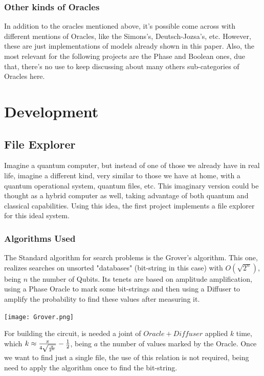 \documentclass{article}
\makeatletter
\renewcommand\subsubsubsection{\@startsection{paragraph}{4}{\z@}{-2.5ex\@plus -1ex \@minus -.25ex}{1.25ex \@plus .25ex}{\normalfont\normalsize\bfseries}}
\makeatother
\begin{document}
\subsubsection{Other kinds of Oracles}
In addition to the oracles mentioned above, it's possible come across with different mentions of Oracles, like the Simons's, Deutsch-Jozsa's, etc. However, these are just implementations of models already shown in this paper. Also, the most relevant for the following projects are the Phase and Boolean ones, due that, there's no use to keep discussing about many others sub-categories of Oracles here.

\newpage

\section{Development}


\subsection{File Explorer} \label{file-explorer}
Imagine a quantum computer, but instead of one of those we already have in real life, imagine a different kind, very similar to those we have at home, with a quantum operational system, quantum files, etc. This imaginary version could be thought as a hybrid computer as well, taking advantage of both quantum and classical capabilities. Using this idea, the first project implements a file explorer for this ideal system.

\subsubsection{Algorithms Used}

\subsubsubsection{Grover}
The Standard algorithm for search problems is the Grover's algorithm. This one, realizes searches on unsorted "databases" (bit-string in this case) with $O(\sqrt{2^n})$, being $n$ the number of Qubits. Its tenets are based on amplitude amplification, using a Phase Oracle to mark some bit-strings and then using a Diffuser to amplify the probability to find these values after measuring it.

\begin{center}
	\texttt{[image: Grover.png]}
	\label{fig:grover-default-circuit}
\end{center}

For building the circuit, is needed a joint of $Oracle + Diffuser$ applied $k$ time, which $k \approx { {\pi \over {4 \sqrt{a\over{2^n}}}} - {1\over2}  }$, being $a$ the number of values marked by the Oracle. Once we want to find just a single file, the use of this relation is not required, being need to apply the algorithm once to find the bit-string.
\end{document}
